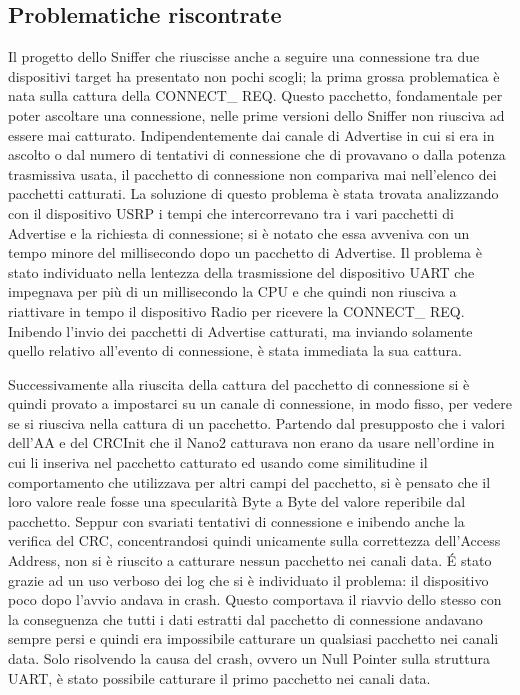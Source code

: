 \subsection{Problematiche riscontrate}
Il progetto dello Sniffer che riuscisse anche a seguire una connessione tra due dispositivi target ha presentato non pochi scogli; la prima grossa problematica è nata sulla cattura della CONNECT\_ REQ. Questo pacchetto, fondamentale per poter ascoltare una connessione, nelle prime versioni dello Sniffer non riusciva ad essere mai catturato. Indipendentemente dai canale di Advertise in cui si era in ascolto o dal numero di tentativi di connessione che di provavano o dalla potenza trasmissiva usata, il pacchetto di connessione non compariva mai nell'elenco dei pacchetti catturati.
La soluzione di questo problema è stata trovata analizzando con il dispositivo USRP i tempi che intercorrevano tra i vari pacchetti di Advertise e la richiesta di connessione; si è notato che essa avveniva con un tempo minore del millisecondo dopo un pacchetto di Advertise. Il problema è stato individuato nella lentezza della trasmissione del dispositivo UART che impegnava per più di un millisecondo la CPU e che quindi non riusciva a riattivare in tempo il dispositivo Radio per ricevere la CONNECT\_ REQ. Inibendo l'invio dei pacchetti di Advertise catturati, ma inviando solamente quello relativo all'evento di connessione, è stata immediata la sua cattura.

Successivamente alla riuscita della cattura del pacchetto di connessione si è quindi provato a impostarci su un canale di connessione, in modo fisso, per vedere se si riusciva nella cattura di un pacchetto.
Partendo dal presupposto che i valori dell'AA e del CRCInit che il Nano2 catturava non erano da usare nell'ordine in cui li inseriva nel pacchetto catturato ed usando come similitudine il comportamento che utilizzava per altri campi del pacchetto, si è pensato che il loro valore reale fosse una specularità Byte a Byte del valore reperibile dal pacchetto. Seppur con svariati tentativi di connessione e inibendo anche la verifica del CRC, concentrandosi quindi unicamente sulla correttezza dell'Access Address, non si è riuscito a catturare nessun pacchetto nei canali data. \'E stato grazie ad un uso verboso dei log che si è individuato il problema: il dispositivo poco dopo l'avvio andava in crash. Questo comportava il riavvio dello stesso con la conseguenza che tutti i dati estratti dal pacchetto di connessione andavano sempre persi e quindi era impossibile catturare un qualsiasi pacchetto nei canali data. Solo risolvendo la causa del crash, ovvero un Null Pointer sulla struttura UART, è stato possibile catturare il primo pacchetto nei canali data.

